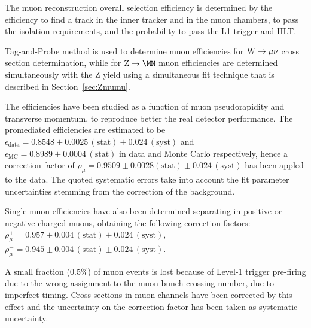 
The muon reconstruction overall selection efficiency 
is determined by the efficiency to find a track in the inner tracker and in the
muon chambers, to pass the isolation requirements, and the probability 
to pass the L1 trigger and HLT.

Tag-and-Probe method is used to determine muon efficiencies for $\mathrm{W} \rightarrow \mu\nu$ cross section determination,
while for $\Zmm$ muon efficiencies are determined simultaneously with the Z yield using a simultaneous
fit technique that is described in Section~\ref{sec:Zmumu}. 

The efficiencies have been studied as a function of muon pseudorapidity and transverse momentum, 
to reproduce better the real detector performance. 
The promediated efficiencies are estimated to be
$\epsilon_{\mathrm{data}} = 0.8548 \pm 0.0025\, \mathrm{(stat)} \pm  0.024\, \mathrm{(syst)}$ and
$\epsilon_{\mathrm{MC}} = 0.8989  \pm   0.0004\, \mathrm{(stat)}$ in data and Monte Carlo respectively,
hence a correction factor of $\rho_\mu= 0.9509 \pm  0.0028 \mathrm{(stat)} \pm  0.024\, \mathrm{(syst)}$
has been appled to the data.
The quoted systematic errors take into account the fit parameter uncertainties stemming 
from the correction of the background.

Single-muon efficiencies have also been determined separating in positive or negative charged muons, 
obtaining the following correction factors: $\rho_\mu^+ = 0.957 \pm 0.004\,\mathrm{(stat)} \pm 0.024\,\mathrm{(syst)}$,
$\rho_\mu^- = 0.945 \pm 0.004\,\mathrm{(stat)} \pm 0.024\,\mathrm{(syst)}$.

A small fraction (0.5\%) of muon events is lost because of Level-1 trigger pre-firing
due to the wrong assignment to the muon bunch crossing number, due to imperfect timing. 
Cross sections in muon channels have been corrected by this effect and
the uncertainty on the correction factor has been taken as systematic uncertainty.

